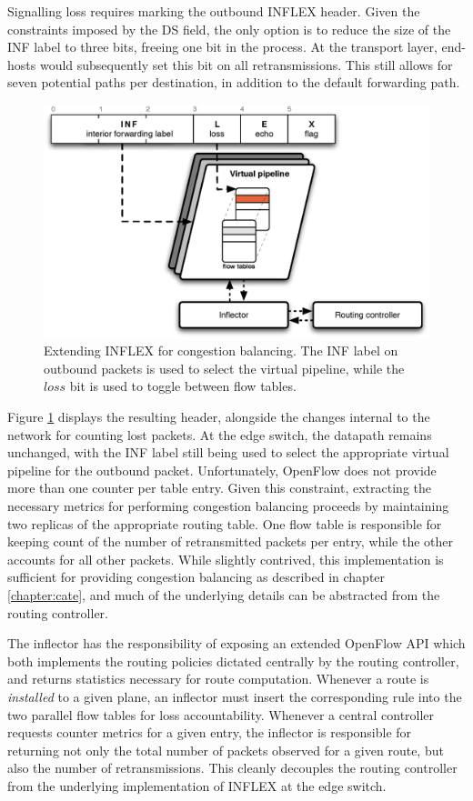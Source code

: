 Signalling loss requires marking the outbound INFLEX header.
Given the constraints imposed by the \ac{DS} field, the only option is to reduce the size of the \ac{INF} label to three bits, freeing one bit in the process.
At the transport layer, end-hosts would subsequently set this bit on all retransmissions.
This still allows for seven potential paths per destination, in addition to the default forwarding path.

\begin{figure}
    \centering
    \includegraphics[width=0.7\linewidth]{figures/inflex/infloss}
    \caption[Extending INFLEX for congestion balancing.]{Extending INFLEX for congestion balancing. The \ac{INF} label on outbound packets is used to select the virtual pipeline, while the $loss$ bit is used to toggle between flow tables.\label{fig:inflexloss}}
\end{figure}

Figure \ref{fig:inflexloss} displays the resulting header, alongside the changes internal to the network for counting lost packets.
At the edge switch, the datapath remains unchanged, with the \ac{INF} label still being used to select the appropriate virtual pipeline for the outbound packet.
Unfortunately, OpenFlow does not provide more than one counter per table entry.
Given this constraint, extracting the necessary metrics for performing congestion balancing proceeds by maintaining two replicas of the appropriate routing table.
One flow table is responsible for keeping count of the number of retransmitted packets per entry, while the other accounts for all other packets.
While slightly contrived, this implementation is sufficient for providing congestion balancing as described in chapter \ref{chapter:cate}, and much of the underlying details can be abstracted from the routing controller.

The inflector has the responsibility of exposing an extended OpenFlow \ac{API} which both implements the routing policies dictated centrally by the routing controller, and returns statistics necessary for route computation.
Whenever a route is \emph{installed} to a given plane, an inflector must insert the corresponding rule into the two parallel flow tables for loss accountability.
Whenever a central controller requests counter metrics for a given entry, the inflector is responsible for returning not only the total number of packets observed for a given route, but also the number of retransmissions.
This cleanly decouples the routing controller from the underlying implementation of INFLEX at the edge switch.
